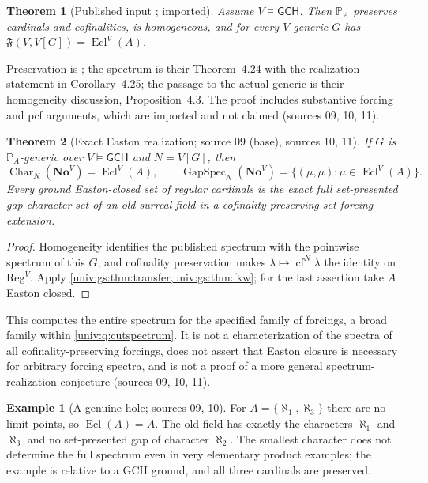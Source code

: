 \documentclass[11pt,letterpaper]{article}
\numberwithin{equation}{section}
\newtheorem{theorem}{Theorem}[section]
\theoremstyle{definition}
\newtheorem{example}[example]{Example}
\theoremstyle{remark}
\newcommand{\No}{\mathbf{No}}
\newcommand{\cf}{\operatorname{cf}}
\newcommand{\GapSpec}{\operatorname{GapSpec}}
\newcommand{\Char}{\operatorname{Char}}
\newcommand{\FF}{\mathfrak F}
\newcommand{\Reg}{\mathrm{Reg}}
\newcommand{\Ecl}{\operatorname{Ecl}}
\newcommand{\GCH}{\mathsf{GCH}}
\begin{document}
\begin{theorem}[Published input \cite{FKW}; imported]\label{univ:gs:thm:fkw}
Assume $V\models\GCH$. Then $\mathbb P_A$ preserves cardinals and cofinalities, is
homogeneous, and for every $V$-generic $G$ has $\FF(V,V[G])=\Ecl^V(A)$.
\end{theorem}

Preservation is \cite[Proposition~4.10]{FKW}; the spectrum is their Theorem~4.24 with
the realization statement in Corollary~4.25; the passage to the actual generic is
their homogeneity discussion, Proposition~4.3. The proof includes substantive forcing
and pcf arguments, which are imported and not claimed (sources 09, 10, 11).

\begin{theorem}[Exact Easton realization; source 09 (base), sources 10, 11]\label{univ:gs:thm:easton}
If $G$ is $\mathbb P_A$-generic over $V\models\GCH$ and $N=V[G]$, then
\[
 \Char_N(\No^V)=\Ecl^V(A),\qquad \GapSpec_N(\No^V)=\{(\mu,\mu):\mu\in\Ecl^V(A)\}.
\]
Every ground Easton-closed set of regular cardinals is the exact full set-presented
gap-character set of an old surreal field in a cofinality-preserving set-forcing
extension.
\end{theorem}
\begin{proof}
Homogeneity identifies the published spectrum with the pointwise spectrum of this $G$,
and cofinality preservation makes $\lambda\mapsto\cf^N\lambda$ the identity on
$\Reg^V$. Apply \cref{univ:gs:thm:transfer,univ:gs:thm:fkw}; for the last assertion
take $A$ Easton closed.
\end{proof}

This computes the entire spectrum for the specified family of forcings, a broad family
within \cref{univ:q:cutspectrum}. It is not a characterization of the spectra of all
cofinality-preserving forcings, does not assert that Easton closure is necessary for
arbitrary forcing spectra, and is not a proof of a more general spectrum-realization
conjecture (sources 09, 10, 11).

\begin{example}[A genuine hole; sources 09, 10]\label{univ:gs:ex:hole}
For $A=\{\aleph_1,\aleph_3\}$ there are no limit points, so $\Ecl(A)=A$. The old field
has exactly the characters $\aleph_1$ and $\aleph_3$ and no set-presented gap of
character $\aleph_2$. The smallest character does not determine the full spectrum even
in very elementary product examples; the example is relative to a GCH ground, and all
three cardinals are preserved.
\end{example}
\end{document}
